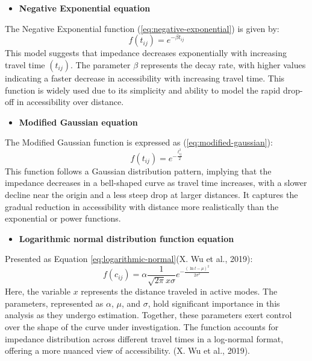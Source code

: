\documentclass[12pt,twoside]{reedthesis}
\providecommand{\tightlist}{%
  \setlength{\itemsep}{0pt}\setlength{\parskip}{0pt}}
\begin{document}
\begin{itemize}
\tightlist
\item
  \textbf{Negative Exponential equation}
\end{itemize}
The Negative Exponential function (\eqref{eq:negative-exponential}) is given by:
\begin{equation}
f(t_{ij}) = e^{-\beta t_{ij}}
\label{eq:negative-exponential}
\end{equation}
This model suggests that impedance decreases exponentially with increasing travel time \((t_{ij})\). The parameter \(\beta\) represents the decay rate, with higher values indicating a faster decrease in accessibility with increasing travel time. This function is widely used due to its simplicity and ability to model the rapid drop-off in accessibility over distance.
\begin{itemize}
\tightlist
\item
  \textbf{Modified Gaussian equation}
\end{itemize}
The Modified Gaussian function is expressed as (\eqref{eq:modified-gaussian}):
\begin{equation}
f(t_{ij}) = e^{-\frac{t_{ij}^2}{2}}
\label{eq:modified-gaussian}
\end{equation}
This function follows a Gaussian distribution pattern, implying that the impedance decreases in a bell-shaped curve as travel time increases, with a slower decline near the origin and a less steep drop at larger distances. It captures the gradual reduction in accessibility with distance more realistically than the exponential or power functions.
\begin{itemize}
\tightlist
\item
  \textbf{Logarithmic normal distribution function equation}
\end{itemize}
Presented as Equation \eqref{eq:logarithmic-normal}(X. Wu et al., 2019):
\begin{equation}
f(c_{ij}) = \alpha \frac{1}{\sqrt{2\pi} x \sigma} e^{-\frac{(\ln t - \mu)^2}{2\sigma^2}}
\label{eq:logarithmic-normal}
\end{equation}
Here, the variable \(x\) represents the distance traveled in active modes. The parameters, represented as \(\alpha\), \(\mu\), and \(\sigma\), hold significant importance in this analysis as they undergo estimation. Together, these parameters exert control over the shape of the curve under investigation. The function accounts for impedance distribution across different travel times in a log-normal format, offering a more nuanced view of accessibility. (X. Wu et al., 2019).
\end{document}

